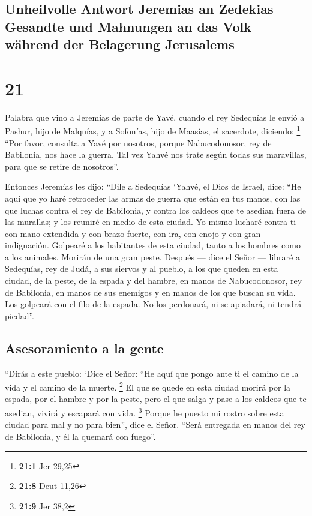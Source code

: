 \begin{paracol}{2}
{\subsection{Unheilvolle Antwort Jeremias an Zedekias Gesandte und
Mahnungen an das Volk während der Belagerung
Jerusalems}\label{unheilvolle-antwort-jeremias-an-zedekias-gesandte-und-mahnungen-an-das-volk-wuxe4hrend-der-belagerung-jerusalems}}

\hypertarget{section-40}{%
\section{21}\label{section-40}}

 Palabra que vino a Jeremías de parte de Yavé, cuando el
rey Sedequías le envió a Pashur, hijo de Malquías, y a Sofonías, hijo de
Maasías, el sacerdote, diciendo: \footnote{\textbf{21:1} Jer 29,25}
 ``Por favor, consulta a Yavé por nosotros, porque
Nabucodonosor, rey de Babilonia, nos hace la guerra. Tal vez Yahvé nos
trate según todas sus maravillas, para que se retire de nosotros''.

 Entonces Jeremías les dijo: ``Dile a Sedequías
 `Yahvé, el Dios de Israel, dice: ``He aquí que yo haré
retroceder las armas de guerra que están en tus manos, con las que
luchas contra el rey de Babilonia, y contra los caldeos que te asedian
fuera de las murallas; y los reuniré en medio de esta ciudad.
 Yo mismo lucharé contra ti con mano extendida y con brazo
fuerte, con ira, con enojo y con gran indignación. 
Golpearé a los habitantes de esta ciudad, tanto a los hombres como a los
animales. Morirán de una gran peste.  Después --- dice el
Señor --- libraré a Sedequías, rey de Judá, a sus siervos y al pueblo, a
los que queden en esta ciudad, de la peste, de la espada y del hambre,
en manos de Nabucodonosor, rey de Babilonia, en manos de sus enemigos y
en manos de los que buscan su vida. Los golpeará con el filo de la
espada. No los perdonará, ni se apiadará, ni tendrá piedad''.

\hypertarget{asesoramiento-a-la-gente}{%
\subsection{Asesoramiento a la gente}\label{asesoramiento-a-la-gente}}

 ``Dirás a este pueblo: `Dice el Señor: ``He aquí que
pongo ante ti el camino de la vida y el camino de la muerte. \footnote{\textbf{21:8}
  Deut 11,26}  El que se quede en esta ciudad morirá por
la espada, por el hambre y por la peste, pero el que salga y pase a los
caldeos que te asedian, vivirá y escapará con vida. \footnote{\textbf{21:9}
  Jer 38,2}  Porque he puesto mi rostro sobre esta ciudad
para mal y no para bien'', dice el Señor. ``Será entregada en manos del
rey de Babilonia, y él la quemará con fuego''.


\end{paracol}

